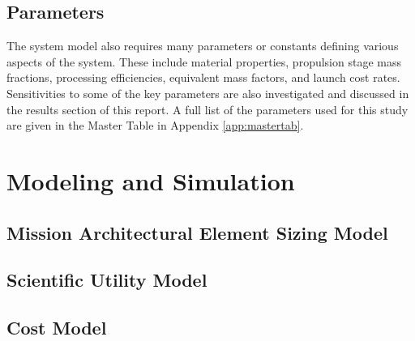 \documentclass[]{aiaa-pretty}
\begin{document}
\subsection{Parameters}
\label{sec:params}
The system model also requires many parameters or constants defining various aspects of the system. These include material properties, propulsion stage mass fractions, processing efficiencies, equivalent mass factors, and launch cost rates. Sensitivities to some of the key parameters are also investigated and discussed in the results section of this report. A full list of the parameters used for this study are given in the Master Table in Appendix \ref{app:mastertab}. 

\section{Modeling and Simulation}
\label{sec:model}

\subsection{Mission Architectural Element Sizing Model}
	
\subsection{Scientific Utility Model}

\subsection{Cost Model}
\end{document}
